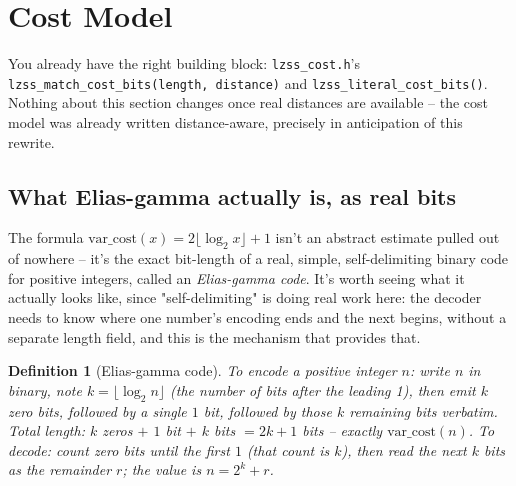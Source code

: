 \documentclass[11pt]{article}
\newtheorem{definition}{Definition}
\begin{document}
\section{Cost Model}
\label{sec:cost}

You already have the right building block: \texttt{lzss\_cost.h}'s
\texttt{lzss\_match\_cost\_bits(length, distance)} and
\texttt{lzss\_literal\_cost\_bits()}. Nothing about this section changes once real
distances are available -- the cost model was already written distance-aware, precisely
in anticipation of this rewrite.

\subsection{What Elias-gamma actually is, as real bits}
\label{sec:eliasgamma}

The formula $\text{var\_cost}(x) = 2\lfloor\log_2 x\rfloor + 1$ isn't an abstract
estimate pulled out of nowhere -- it's the exact bit-length of a real, simple,
self-delimiting binary code for positive integers, called an \emph{Elias-gamma code}.
It's worth seeing what it actually looks like, since "self-delimiting" is doing real
work here: the decoder needs to know where one number's encoding ends and the next
begins, without a separate length field, and this is the mechanism that provides that.

\begin{definition}[Elias-gamma code]
To encode a positive integer $n$: write $n$ in binary, note $k = \lfloor \log_2 n
\rfloor$ (the number of bits \emph{after} the leading 1), then emit $k$ zero bits,
followed by a single $1$ bit, followed by those $k$ remaining bits verbatim. Total
length: $k$ zeros $+$ $1$ bit $+$ $k$ bits $= 2k+1$ bits -- exactly
$\text{var\_cost}(n)$. To decode: count zero bits until the first $1$ (that count is
$k$), then read the next $k$ bits as the remainder $r$; the value is $n = 2^k + r$.
\end{definition}
\end{document}
